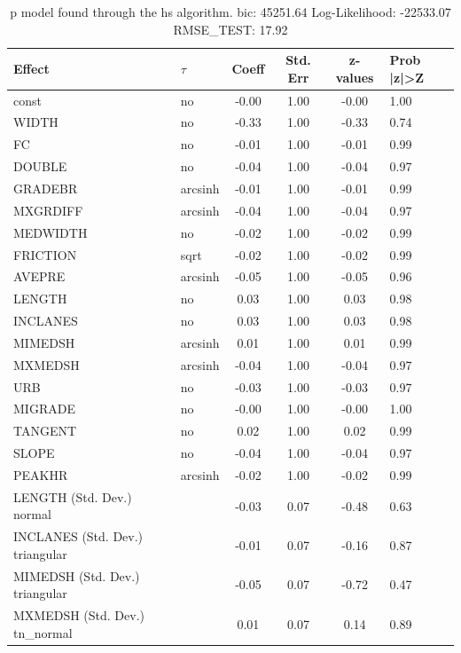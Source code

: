 \begin{table}
	\caption{p model found through the hs algorithm. bic: 45251.64 Log-Likelihood: -22533.07 RMSE_TEST: 17.92}
	\begin{center}
		\begin{tabular}{|l|l|c|c|c|l|}
			\hline
			Effect & $\tau$ & Coeff & Std. Err & z-values & Prob |z|>Z \\
			\hline
			const & no & -0.00 & 1.00 & -0.00 & 1.00 \\
			\hline
			WIDTH & no & -0.33 & 1.00 & -0.33 & 0.74 \\
			\hline
			FC & no & -0.01 & 1.00 & -0.01 & 0.99 \\
			\hline
			DOUBLE & no & -0.04 & 1.00 & -0.04 & 0.97 \\
			\hline
			GRADEBR & arcsinh & -0.01 & 1.00 & -0.01 & 0.99 \\
			\hline
			MXGRDIFF & arcsinh & -0.04 & 1.00 & -0.04 & 0.97 \\
			\hline
			MEDWIDTH & no & -0.02 & 1.00 & -0.02 & 0.99 \\
			\hline
			FRICTION & sqrt & -0.02 & 1.00 & -0.02 & 0.99 \\
			\hline
			AVEPRE & arcsinh & -0.05 & 1.00 & -0.05 & 0.96 \\
			\hline
			LENGTH & no & 0.03 & 1.00 & 0.03 & 0.98 \\
			\hline
			INCLANES & no & 0.03 & 1.00 & 0.03 & 0.98 \\
			\hline
			MIMEDSH & arcsinh & 0.01 & 1.00 & 0.01 & 0.99 \\
			\hline
			MXMEDSH & arcsinh & -0.04 & 1.00 & -0.04 & 0.97 \\
			\hline
			URB & no & -0.03 & 1.00 & -0.03 & 0.97 \\
			\hline
			MIGRADE & no & -0.00 & 1.00 & -0.00 & 1.00 \\
			\hline
			TANGENT & no & 0.02 & 1.00 & 0.02 & 0.99 \\
			\hline
			SLOPE & no & -0.04 & 1.00 & -0.04 & 0.97 \\
			\hline
			PEAKHR & arcsinh & -0.02 & 1.00 & -0.02 & 0.99 \\
			\hline
			LENGTH (Std. Dev.) normal &  & -0.03 & 0.07 & -0.48 & 0.63 \\
			\hline
			INCLANES (Std. Dev.) triangular &  & -0.01 & 0.07 & -0.16 & 0.87 \\
			\hline
			MIMEDSH (Std. Dev.) triangular &  & -0.05 & 0.07 & -0.72 & 0.47 \\
			\hline
			MXMEDSH (Std. Dev.) tn_normal &  & 0.01 & 0.07 & 0.14 & 0.89 \\

\end{tabular}
\end{center}
\end{table}
